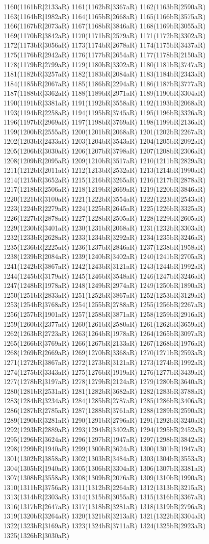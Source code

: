 1160(1161bR|2133aR) 1161(1162bR|3367aR) 1162(1163bR|2590aR) 1163(1164bR|1982aR) 1164(1165bR|2668aR) 1165(1166bR|3575aR) 1166(1167bR|2073aR) 1167(1168bR|3846aR) 1168(1169bR|3055aR) 1169(1170bR|3842aR) 1170(1171bR|2579aR) 1171(1172bR|3302aR) 1172(1173bR|3056aR) 1173(1174bR|2678aR) 1174(1175bR|3437aR) 1175(1176bR|2942aR) 1176(1177bR|2654aR) 1177(1178bR|2150aR) 1178(1179bR|2799aR) 1179(1180bR|3302aR) 1180(1181bR|3747aR) 1181(1182bR|3257aR) 1182(1183bR|2084aR) 1183(1184bR|2343aR) 1184(1185bR|2067aR) 1185(1186bR|2294aR) 1186(1187bR|3777aR) 1187(1188bR|3362aR) 1188(1189bR|2971aR) 1189(1190bR|3304aR) 1190(1191bR|3381aR) 1191(1192bR|3558aR) 1192(1193bR|2068aR) 1193(1194bR|2258aR) 1194(1195bR|3745aR) 1195(1196bR|3326aR) 1196(1197bR|2969aR) 1197(1198bR|3769aR) 1198(1199bR|2136aR) 1199(1200bR|2555aR) 1200(1201bR|2068aR) 1201(1202bR|2267aR) 1202(1203bR|2433aR) 1203(1204bR|3543aR) 1204(1205bR|2092aR) 1205(1206bR|3030aR) 1206(1207bR|3798aR) 1207(1208bR|2306aR) 1208(1209bR|2095aR) 1209(1210bR|3517aR) 1210(1211bR|2829aR) 1211(1212bR|2011aR) 1212(1213bR|2532aR) 1213(1214bR|1990aR) 1214(1215bR|3652aR) 1215(1216bR|3265aR) 1216(1217bR|2878aR) 1217(1218bR|2506aR) 1218(1219bR|2669aR) 1219(1220bR|3846aR) 1220(1221bR|3100aR) 1221(1222bR|3554aR) 1222(1223bR|2543aR) 1223(1224bR|2279aR) 1224(1225bR|2645aR) 1225(1226bR|3325aR) 1226(1227bR|2878aR) 1227(1228bR|2505aR) 1228(1229bR|2605aR) 1229(1230bR|3401aR) 1230(1231bR|2068aR) 1231(1232bR|3303aR) 1232(1233bR|2628aR) 1233(1234bR|3292aR) 1234(1235bR|3246aR) 1235(1236bR|2225aR) 1236(1237bR|2846aR) 1237(1238bR|1958aR) 1238(1239bR|2084aR) 1239(1240bR|3402aR) 1240(1241bR|2705aR) 1241(1242bR|3867aR) 1242(1243bR|3121aR) 1243(1244bR|1992aR) 1244(1245bR|3179aR) 1245(1246bR|3548aR) 1246(1247bR|3246aR) 1247(1248bR|1978aR) 1248(1249bR|2974aR) 1249(1250bR|1890aR) 1250(1251bR|2833aR) 1251(1252bR|3867aR) 1252(1253bR|3129aR) 1253(1254bR|3768aR) 1254(1255bR|2788aR) 1255(1256bR|2267aR) 1256(1257bR|1901aR) 1257(1258bR|3871aR) 1258(1259bR|2916aR) 1259(1260bR|2377aR) 1260(1261bR|2580aR) 1261(1262bR|3659aR) 1262(1263bR|2723aR) 1263(1264bR|1978aR) 1264(1265bR|3097aR) 1265(1266bR|3769aR) 1266(1267bR|2133aR) 1267(1268bR|1976aR) 1268(1269bR|2669aR) 1269(1270bR|3368aR) 1270(1271bR|2593aR) 1271(1272bR|3867aR) 1272(1273bR|3121aR) 1273(1274bR|1992aR) 1274(1275bR|3343aR) 1275(1276bR|1919aR) 1276(1277bR|3439aR) 1277(1278bR|3197aR) 1278(1279bR|2124aR) 1279(1280bR|3640aR) 1280(1281bR|2531aR) 1281(1282bR|3682aR) 1282(1283bR|3788aR) 1283(1284bR|3234aR) 1284(1285bR|2787aR) 1285(1286bR|3406aR) 1286(1287bR|2785aR) 1287(1288bR|3761aR) 1288(1289bR|2590aR) 1289(1290bR|3281aR) 1290(1291bR|2796aR) 1291(1292bR|3240aR) 1292(1293bR|2889aR) 1293(1294bR|3402aR) 1294(1295bR|2452aR) 1295(1296bR|3624aR) 1296(1297bR|1947aR) 1297(1298bR|3842aR) 1298(1299bR|1940aR) 1299(1300bR|3624aR) 1300(1301bR|1947aR) 1301(1302bR|3858aR) 1302(1303bR|3484aR) 1303(1304bR|3553aR) 1304(1305bR|1940aR) 1305(1306bR|3304aR) 1306(1307bR|3381aR) 1307(1308bR|3558aR) 1308(1309bR|2076aR) 1309(1310bR|1990aR) 1310(1311bR|3756aR) 1311(1312bR|2264aR) 1312(1313bR|3215aR) 1313(1314bR|2303aR) 1314(1315bR|3055aR) 1315(1316bR|3367aR) 1316(1317bR|2647aR) 1317(1318bR|3281aR) 1318(1319bR|2796aR) 1319(1320bR|3264aR) 1320(1321bR|3213aR) 1321(1322bR|3304aR) 1322(1323bR|3169aR) 1323(1324bR|3711aR) 1324(1325bR|2923aR) 1325(1326bR|3030aR) 